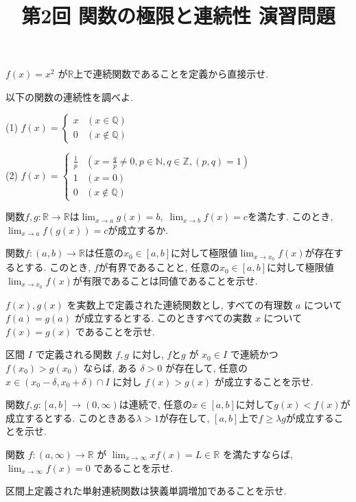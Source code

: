 \documentclass[dvipdfmx,11pt]{jsarticle}
\title{第2回 関数の極限と連続性 演習問題}
\author{}
\date{}
\newcommand{\dsp}{\displaystyle}
\newcommand{\prob}{\vspace{2mm}\pro}
\theoremstyle{definition}
\numberwithin{equation}{section}
\begin{document}
\maketitle

\vspace{-1.5cm}

\pro $f(x)=x^2$ が$\mathbb{R}$上で連続関数であることを定義から直接示せ.
	
\prob 以下の関数の連続性を調べよ.
	
(1) $f(x)=
\begin{cases}
		x & (x\in\mathbb{Q}) \\ 0 & (x\notin\mathbb{Q})
\end{cases}$

(2) $f(x)=
\begin{cases}
		\dsp \frac{1}{p} & (x=\dsp \frac{q}{p}\neq0 , p\in\mathbb{N} , q\in\mathbb{Z} , (p , q)=1) \\ 1 & (x=0) \\ 0 & (x\notin\mathbb{Q})
\end{cases}$

\prob 関数$f, g : \mathbb{R}\rightarrow\mathbb{R}$は$\dsp\lim_{x\rightarrow a}g(x)=b, \;\lim_{x\rightarrow b}f(x)=c$を満たす. このとき, $\dsp\lim_{x\rightarrow a}f(g(x))=c$が成立するか.

\prob 関数$f : (a, b)\rightarrow\mathbb{R}$は任意の$x_0\in[a,b]$に対して極限値$\dsp\lim_{x\rightarrow x_0}f(x)$が存在するとする. このとき, $f$が有界であることと, 任意の$x_0\in[a,b]$に対して極限値$\dsp\lim_{x\rightarrow x_0}f(x)$が有限であることは同値であることを示せ.

\prob $f(x) , g(x)$ を実数上で定義された連続関数とし, すべての有理数 $a$ について $f(a) = g(a)$ が成立するとする. このときすべての実数 $x$ について $f(x)=g(x)$ であることを示せ.
	
\prob 区間 $I$ で定義される関数 $f , g$ に対し, $f と g$ が $x_0\in I$ で連続かつ $f(x_0)>g(x_0)$ ならば, ある $\delta >0$ が存在して, 任意の $x\in (x_0-\delta , x_0+\delta)\cap I$ に対し $f(x)>g(x)$ が成立することを示せ.

\prob 関数$f,g : [a,b]\rightarrow(0, \infty)$は連続で, 任意の$x\in[a,b]$に対して$g(x)<f(x)$が成立するとする. このときある$\lambda>1$が存在して, $[a,b]$上で$f\geq\lambda g$が成立することを示せ.

\prob 関数 $f : (a,\infty)\rightarrow \mathbb{R}$ が $\dsp\lim_{x\rightarrow\infty}xf(x)=L\in\mathbb{R}$ を満たすならば, $\dsp\lim_{x\rightarrow\infty}f(x)=0$ 
であることを示せ.

\prob 区間上定義された単射連続関数は狭義単調増加であることを示せ.
\end{document}
